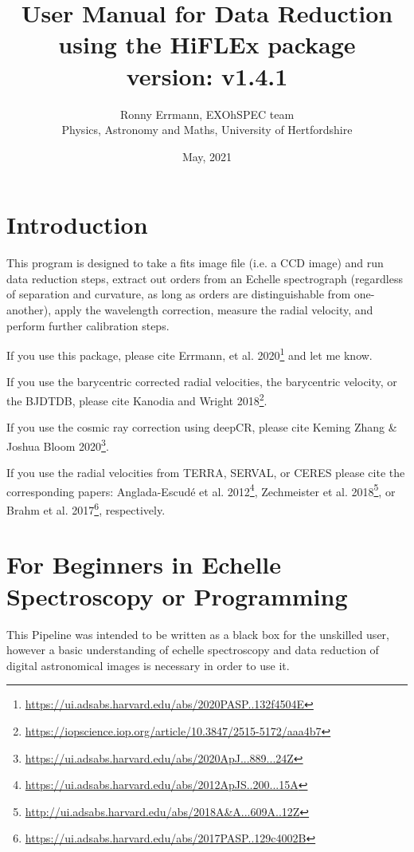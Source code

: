 \documentclass[10pt,a4paper]{article}
\title{User Manual for Data Reduction using the HiFLEx package\\ version: v1.4.1}
\date{May, 2021}
\author{Ronny Errmann, EXOhSPEC team\\ Physics, Astronomy and Maths, University of Hertfordshire}
\begin{document}
\maketitle

\tableofcontents
{}


\newpage


\section{Introduction}
\label{intro}

This program is designed to take a fits image file (i.e. a CCD image) and run data reduction steps, extract out orders from an Echelle spectrograph (regardless of separation and curvature, as long as orders are distinguishable from one-another), apply the wavelength correction, measure the radial velocity, and perform further calibration steps.

If you use this package, please cite Errmann, et al. 2020\footnote{\url{https://ui.adsabs.harvard.edu/abs/2020PASP..132f4504E}} and let me know.

If you use the barycentric corrected radial velocities, the barycentric velocity, or the BJDTDB, please cite Kanodia and Wright 2018\footnote{\url{https://iopscience.iop.org/article/10.3847/2515-5172/aaa4b7}}.

If you use the cosmic ray correction using deepCR, please cite Keming Zhang \& Joshua Bloom 2020\footnote{\url{https://ui.adsabs.harvard.edu/abs/2020ApJ...889...24Z}}.

If you use the radial velocities from TERRA, SERVAL, or CERES please cite the corresponding papers: Anglada-Escud{\'e} et al. 2012\footnote{\url{https://ui.adsabs.harvard.edu/abs/2012ApJS..200...15A}}, Zechmeister et al. 2018\footnote{\url{http://ui.adsabs.harvard.edu/abs/2018A&A...609A..12Z}}, or 
Brahm et al. 2017\footnote{\url{https://ui.adsabs.harvard.edu/abs/2017PASP..129c4002B}}, respectively.


\section{For Beginners in Echelle Spectroscopy or Programming}

This Pipeline was intended to be written as a black box for the unskilled user, however a basic understanding of echelle spectroscopy and data reduction of digital astronomical images is necessary in order to use it.
\end{document}
